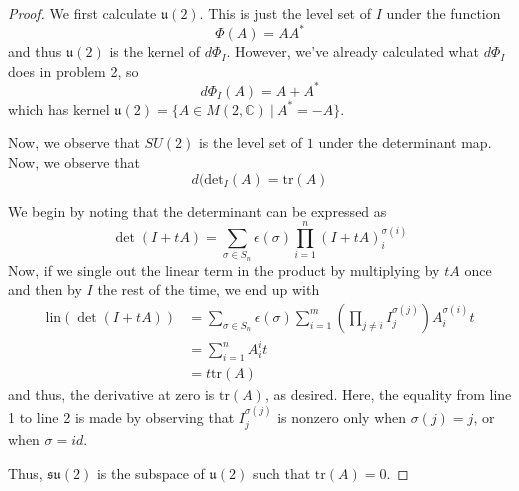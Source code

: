 \documentclass[fontsize=11pt]{scrartcl} %
\numberwithin{equation}{section} %
\numberwithin{figure}{section} %
\numberwithin{table}{section} %
\newcommand{\C}{\mathbb{C}}
\begin{document}
\begin{proof}
    We first calculate $\mathfrak{u}(2)$. This is just the level set of $I$
    under the function
    \[
        \Phi(A) = AA^*
    \]
    and thus $\mathfrak{u}(2)$ is the kernel of $d\Phi_I$. However, we've
    already calculated what $d\Phi_I$ does in problem 2, so
    \[
        d\Phi_I(A) = A + A^*
    \]
    which has kernel $\mathfrak{u}(2) = \{A\in M(2,\C)\ |\ A^*=-A\}$.

    Now, we observe that $SU(2)$ is the level set of $1$ under the determinant
    map. Now, we observe that
    \[
        d(\text{det}_I(A) = \text{tr}(A)
    \]
    
We begin by noting that the determinant can be expressed as
    \[
        \det(I+tA) = \sum_{\sigma\in
        S_n}\epsilon(\sigma)\prod_{i=1}^{n}(I+tA)_i^{\sigma(i)}
    \]
    Now, if we single out the linear term in the product by multiplying by $tA$
    once and then by $I$ the rest of the time, we end up with
    \[
        \begin{aligned}
            \textrm{lin}(\det(I+tA)) &= \sum_{\sigma\in S_n}
        \epsilon(\sigma)\sum_{i=1}^m(\prod_{j\neq
        i}I_j^{\sigma(j)})A_i^{\sigma(i)}t\\
            &= \sum_{i=1}^nA_i^it\\
            &=t\textrm{tr}(A)
        \end{aligned}
    \]
    and thus, the derivative at zero is $\textrm{tr}(A)$, as desired.
    Here, the equality from line 1 to line 2 is made by observing that
    $I_j^{\sigma(j)}$ is nonzero only when $\sigma(j)=j$, or when $\sigma=id$.

    Thus, $\mathfrak{su}(2)$ is the subspace of $\mathfrak{u}(2)$ such that
    $\text{tr}(A)=0$.


\end{proof}
\end{document}

